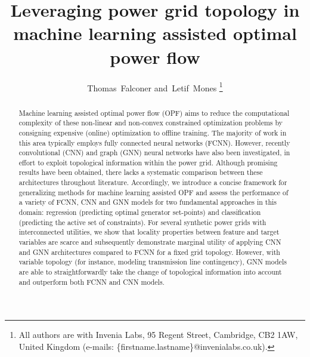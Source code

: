 \documentclass[journal]{IEEEtran}
\begin{document}

\title{Leveraging power grid topology in machine learning assisted optimal power flow}
%
%
%

\author{Thomas~Falconer
        and~Letif~Mones%
\thanks{All authors are with Invenia Labs, 95 Regent Street, Cambridge, CB2 1AW, United Kingdom (e-mails: \{firstname.lastname\}@invenialabs.co.uk).}%
}

\maketitle

\begin{abstract}
Machine learning assisted optimal power flow (OPF) aims to reduce the computational complexity of these non-linear and non-convex constrained optimization problems by consigning expensive (online) optimization to offline training. The majority of work in this area typically employs fully connected neural networks (FCNN). However, recently convolutional (CNN) and graph (GNN) neural networks have also been investigated, in effort to exploit topological information within the power grid. Although promising results have been obtained, there lacks a systematic comparison between these architectures throughout literature. Accordingly, we introduce a concise framework for generalizing methods for machine learning assisted OPF and assess the performance of a variety of FCNN, CNN and GNN models for two fundamental approaches in this domain: regression (predicting optimal generator set-points) and classification (predicting the active set of constraints). For several synthetic power grids with interconnected utilities, we show that locality properties between feature and target variables are scarce and subsequently demonstrate marginal utility of applying CNN and GNN architectures compared to FCNN for a fixed grid topology. However, with variable topology (for instance, modeling transmission line contingency), GNN models are able to straightforwardly take the change of topological information into account and outperform both FCNN and CNN models.
\end{abstract}
\end{document}

